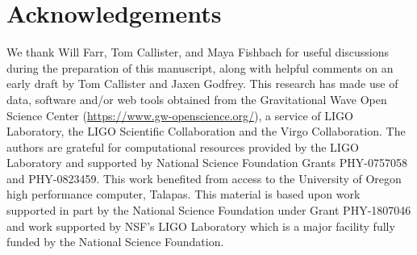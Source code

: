 \documentclass[twocolumn, linenumbers]{aastex631}
\begin{document}





\section{Acknowledgements}\label{sec:acknowledments}
We thank Will Farr, Tom Callister, and Maya Fishbach for useful discussions during the preparation of this manuscript, 
along with helpful comments on an early draft by Tom Callister and Jaxen Godfrey.
This research has made use of data, software and/or web tools obtained from the Gravitational Wave Open Science Center 
(\url{https://www.gw-openscience.org/}), a service of LIGO Laboratory, the LIGO Scientific Collaboration and the Virgo Collaboration. 
The authors are grateful for computational resources provided by the LIGO Laboratory and supported by National Science Foundation Grants PHY-0757058 and PHY-0823459.  
This work benefited from access to the University of Oregon high performance computer, Talapas. This material is based upon work supported 
in part by the National Science Foundation under Grant PHY-1807046 and work supported by NSF's LIGO Laboratory which is a major facility 
fully funded by the National Science Foundation.
{}



\end{document}
